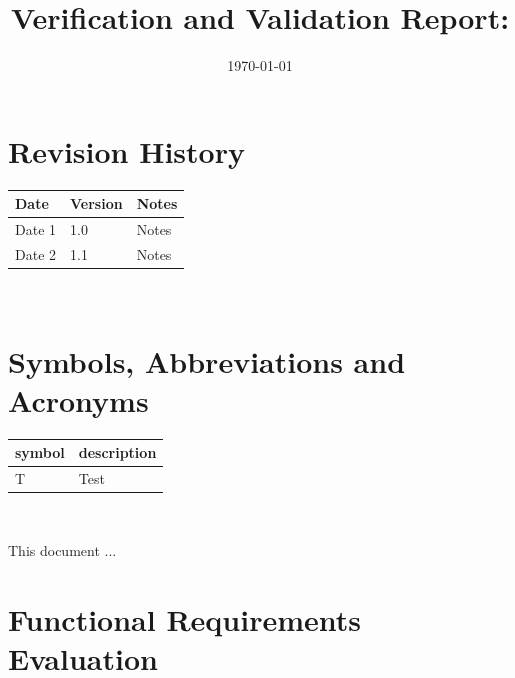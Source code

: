 \documentclass[12pt, titlepage]{article}
\begin{document}
\title{Verification and Validation Report: \progname}
\author{\authname}
\date{\today}

\maketitle


\section{Revision History}

\begin{tabularx}{\textwidth}{p{3cm}p{2cm}X}
  \toprule {\bf Date} & {\bf Version} & {\bf Notes} \\
  \midrule
  Date 1              & 1.0           & Notes       \\
  Date 2              & 1.1           & Notes       \\
  \bottomrule
\end{tabularx}

~\newpage

\section{Symbols, Abbreviations and Acronyms}

\renewcommand{\arraystretch}{1.2}
\begin{tabular}{l l}
  \toprule
  \textbf{symbol} & \textbf{description} \\
  \midrule
  T               & Test                 \\
  \bottomrule
\end{tabular}\\


\newpage

\tableofcontents

\listoftables %

\listoffigures %

\newpage


This document ...

\section{Functional Requirements Evaluation}
\end{document}
